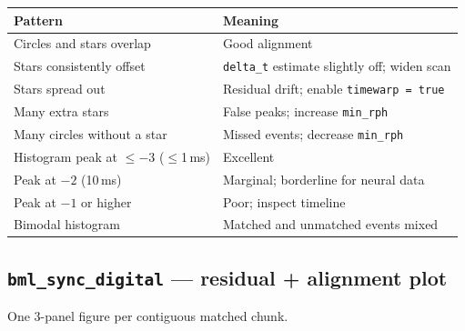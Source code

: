 \documentclass[11pt, a4paper]{article}
\begin{document}
\begin{center}
\renewcommand{\arraystretch}{1.3}
\begin{tabular}{p{5.5cm}p{8cm}}
\toprule
\textbf{Pattern} & \textbf{Meaning} \\
\midrule
Circles and stars overlap & Good alignment \\
Stars consistently offset & \texttt{delta\_t} estimate slightly off; widen scan \\
Stars spread out & Residual drift; enable \texttt{timewarp = true} \\
Many extra stars & False peaks; increase \texttt{min\_rph} \\
Many circles without a star & Missed events; decrease \texttt{min\_rph} \\
\midrule
Histogram peak at $\leq -3$ ($\leq$1\,ms) & Excellent \\
Peak at $-2$ (10\,ms) & Marginal; borderline for neural data \\
Peak at $-1$ or higher & Poor; inspect timeline \\
Bimodal histogram & Matched and unmatched events mixed \\
\bottomrule
\end{tabular}
\end{center}

\subsection{\texttt{bml\_sync\_digital} --- residual + alignment plot}

One 3-panel figure per contiguous matched chunk.
\end{document}
